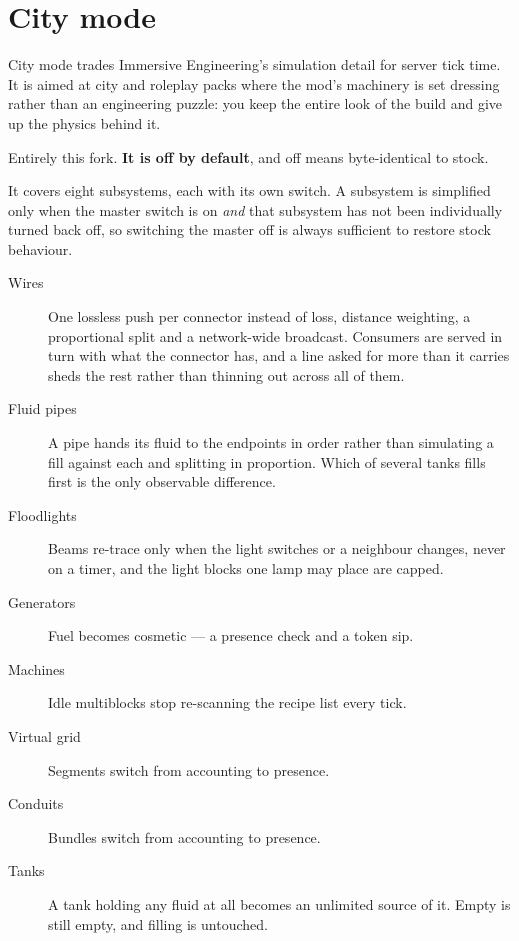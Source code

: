 \chapter{City mode}
\label{ch:citymode}

City mode trades Immersive Engineering's simulation detail for server tick time. It is aimed at city
and roleplay packs where the mod's machinery is set dressing rather than an engineering puzzle: you
keep the entire look of the build and give up the physics behind it.

\begin{iefork}
Entirely this fork. \textbf{It is off by default}, and off means byte-identical to stock.
\end{iefork}

It covers eight subsystems, each with its own switch. A subsystem is simplified only when the master
switch is on \emph{and} that subsystem has not been individually turned back off, so switching the
master off is always sufficient to restore stock behaviour.

\begin{description}
\item[Wires] One lossless push per connector instead of loss, distance weighting, a proportional
      split and a network-wide broadcast. Consumers are served in turn with what the connector has,
      and a line asked for more than it carries sheds the rest rather than thinning out across all
      of them.
\item[Fluid pipes] A pipe hands its fluid to the endpoints in order rather than simulating a fill
      against each and splitting in proportion. Which of several tanks fills first is the only
      observable difference.
\item[Floodlights] Beams re-trace only when the light switches or a neighbour changes, never on a
      timer, and the light blocks one lamp may place are capped.
\item[Generators] Fuel becomes cosmetic --- a presence check and a token sip.
\item[Machines] Idle multiblocks stop re-scanning the recipe list every tick.
\item[Virtual grid] Segments switch from accounting to presence.
\item[Conduits] Bundles switch from accounting to presence.
\item[Tanks] A tank holding any fluid at all becomes an unlimited source of it. Empty is still
      empty, and filling is untouched.
\end{description}

